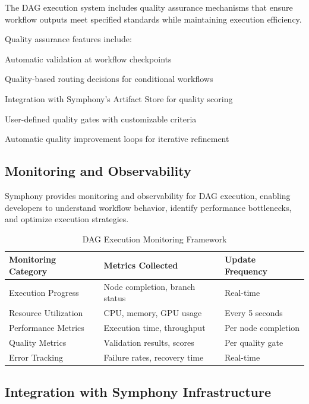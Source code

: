 The DAG execution system includes quality assurance mechanisms that ensure workflow outputs meet specified standards while maintaining execution efficiency.

Quality assurance features include:

\begin{compactlist}
    \item Automatic validation at workflow checkpoints
    \item Quality-based routing decisions for conditional workflows
    \item Integration with Symphony's Artifact Store for quality scoring
    \item User-defined quality gates with customizable criteria
    \item Automatic quality improvement loops for iterative refinement
\end{compactlist}

\subsection*{Monitoring and Observability}

Symphony provides monitoring and observability for DAG execution, enabling developers to understand workflow behavior, identify performance bottlenecks, and optimize execution strategies.

\begin{table}[ht]
\centering
\begin{tabular}{@{}lll@{}}
\toprule
\textbf{Monitoring Category} & \textbf{Metrics Collected} & \textbf{Update Frequency} \\
\midrule
Execution Progress & Node completion, branch status & Real-time \\
Resource Utilization & CPU, memory, GPU usage & Every 5 seconds \\
Performance Metrics & Execution time, throughput & Per node completion \\
Quality Metrics & Validation results, scores & Per quality gate \\
Error Tracking & Failure rates, recovery time & Real-time \\
\bottomrule
\end{tabular}
\caption{DAG Execution Monitoring Framework}
\end{table}

\subsection*{Integration with Symphony Infrastructure}

